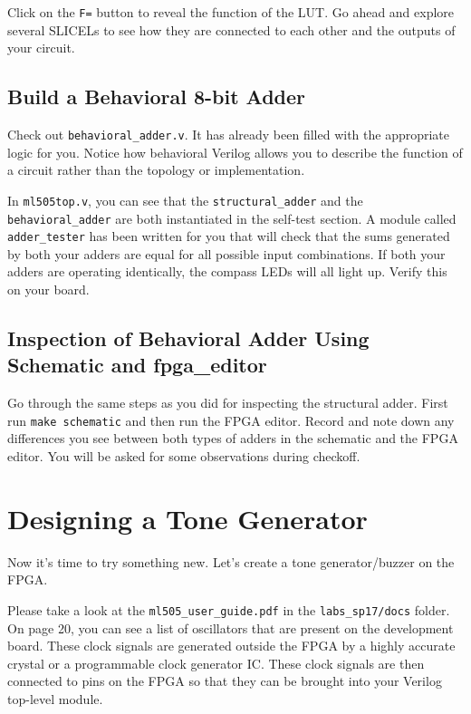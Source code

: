 \documentclass[11pt]{article}
\begin{document}
Click on the \verb|F=| button to reveal the function of the LUT. Go ahead and explore several SLICELs to see how they are connected to each other and the outputs of your circuit.

\subsection{Build a Behavioral 8-bit Adder}

Check out \verb|behavioral_adder.v|. It has already been filled with the appropriate logic for you. Notice how behavioral Verilog allows you to describe the function of a circuit rather than the topology or implementation.

In \verb|ml505top.v|, you can see that the \verb|structural_adder| and the \verb|behavioral_adder| are both instantiated in the self-test section. A module called \verb|adder_tester| has been written for you that will check that the sums generated by both your adders are equal for all possible input combinations. If both your adders are operating identically, the compass LEDs will all light up. Verify this on your board.

\subsection{Inspection of Behavioral Adder Using Schematic and fpga\_editor}

Go through the same steps as you did for inspecting the structural adder. First run \verb|make schematic| and then run the FPGA editor. Record and note down any differences you see between both types of adders in the schematic and the FPGA editor. You will be asked for some observations during checkoff.

\section{Designing a Tone Generator}
Now it's time to try something new. Let's create a tone generator/buzzer on the FPGA.

Please take a look at the \verb|ml505_user_guide.pdf| in the \verb|labs_sp17/docs| folder. On page 20, you can see a list of oscillators that are present on the development board. These clock signals are generated outside the FPGA by a highly accurate crystal or a programmable clock generator IC. These clock signals are then connected to pins on the FPGA so that they can be brought into your Verilog top-level module.
\end{document}
